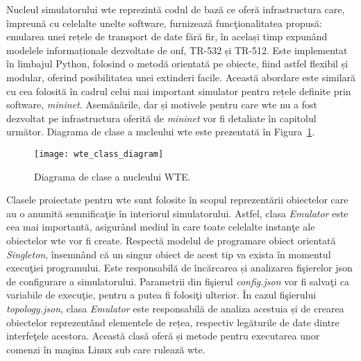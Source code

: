 Nucleul simulatorului \gls{wte} reprezintă codul de bază ce oferă infrastructura care, împreună cu celelalte unelte software, furnizează funcţionalitatea propusă: emularea unei rețele de transport de date fără fir, în același timp expunând modelele informaționale dezvoltate de \gls{onf}, TR-532 și TR-512. Este implementat în limbajul Python, folosind o metodă orientată pe obiecte, fiind astfel flexibil și modular, oferind posibilitatea unei extinderi facile. Această abordare este similară cu cea folosită în cadrul celui mai important simulator pentru rețele definite prin software, \textit{mininet}. Asemănările, dar și motivele pentru care \gls{wte} nu a fost dezvoltat pe infrastructura oferită de \textit{mininet} vor fi detaliate în capitolul următor. Diagrama de clase a nucleului \gls{wte} este prezentată în Figura~\ref{fig:wte_class_diagram}.

\begin{figure}[h]
	\centering
	\texttt{[image: wte\_class\_diagram]}
	\caption{Diagrama de clase a nucleului WTE.}
	\label{fig:wte_class_diagram}
\end{figure}

Clasele proiectate pentru \gls{wte} sunt folosite în scopul reprezentării obiectelor care au o anumită semnificaţie în interiorul simulatorului. Astfel, clasa \textit{Emulator} este cea mai importantă, asigurând mediul în care toate celelalte instanţe ale obiectelor \gls{wte} vor fi create. Respectă modelul de programare obiect orientată \textit{Singleton}, însemnând că un singur obiect de acest tip va exista în momentul execuţiei programului. Este responsabilă de încărcarea și analizarea fişierelor \gls{json} de configurare a simulatorului. Parametrii din fişierul \textit{config.json} vor fi salvaţi ca variabile de execuţie, pentru a putea fi folosiţi ulterior. În cazul fişierului \textit{topology.json}, clasa \textit{Emulator} este responsabilă de analiza acestuia și de crearea obiectelor reprezentând elementele de rețea, respectiv legăturile de date dintre interfeţele acestora. Această clasă oferă și metode pentru executarea unor comenzi în maşina Linux sub care rulează \gls{wte}.

